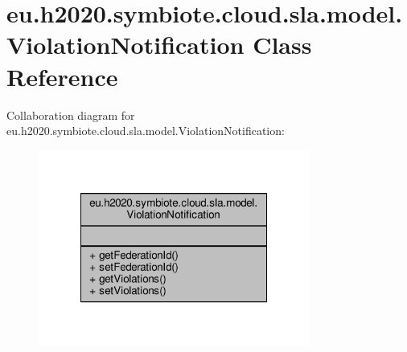 \hypertarget{classeu_1_1h2020_1_1symbiote_1_1cloud_1_1sla_1_1model_1_1ViolationNotification}{}\section{eu.\+h2020.\+symbiote.\+cloud.\+sla.\+model.\+Violation\+Notification Class Reference}
\label{classeu_1_1h2020_1_1symbiote_1_1cloud_1_1sla_1_1model_1_1ViolationNotification}


Collaboration diagram for eu.\+h2020.\+symbiote.\+cloud.\+sla.\+model.\+Violation\+Notification\+:
\nopagebreak
\begin{figure}[H]
\begin{center}
\leavevmode
\includegraphics[width=252pt]{classeu_1_1h2020_1_1symbiote_1_1cloud_1_1sla_1_1model_1_1ViolationNotification__coll__graph}
\end{center}
\end{figure}
